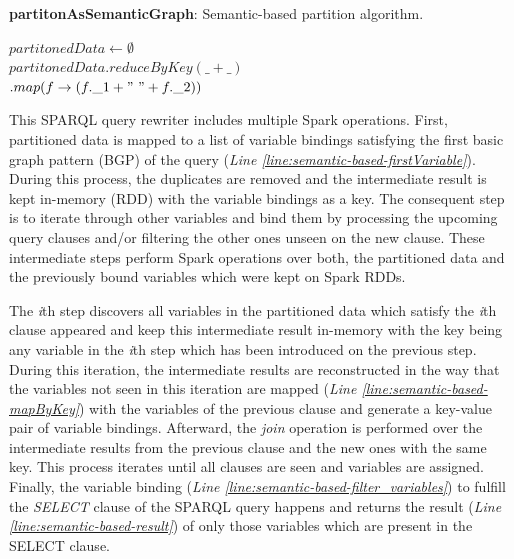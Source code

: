 \begin{algorithm*}
\caption{\textbf{partitonAsSemanticGraph}: Semantic-based partition algorithm.}
\label{alg:semantic-based-partitionGraph}
$partitonedData \leftarrow \emptyset $\\
        $partitonedData.reduceByKey(\_+\_)$\label{line:semantic-based-groupBy}\\
        \quad \quad \quad \quad \quad \quad $.map(f\rightarrow(f.\_1 + "~" + f.\_2))$ \label{line:semantic-based-partitionGraph_map}\\
\end{algorithm*}


This SPARQL query rewriter includes multiple Spark operations.
First, partitioned data is mapped to a list of variable bindings satisfying the first basic graph pattern (BGP) of the query (\textit{Line \ref{line:semantic-based-firstVariable}}). 
During this process, the duplicates are removed and the intermediate result is kept in-memory (RDD) with the variable bindings as a key.
The consequent step is to iterate through other variables and bind them by processing the upcoming query clauses and/or filtering the other ones unseen on the new clause.
These intermediate steps perform Spark operations over both, the partitioned data and the previously bound variables which were kept on Spark RDDs.

The \textit{i}th step discovers all variables in the partitioned data which satisfy the \textit{i}th clause appeared and keep this intermediate result in-memory with the key being any variable in the \textit{i}th step which has been introduced on the previous step.
During this iteration, the intermediate results are reconstructed in the way that the variables not seen in this iteration are mapped (\textit{Line \ref{line:semantic-based-mapByKey}}) with the variables of the previous clause and generate a key-value pair of variable bindings.
Afterward, the \emph{join} operation is performed over the intermediate results from the previous clause and the new ones with the same key.
This process iterates until all clauses are seen and variables are assigned.
Finally, the variable binding (\textit{Line \ref{line:semantic-based-filter_variables}}) to fulfill the \emph{SELECT} clause of the SPARQL query happens and returns the result (\textit{Line \ref{line:semantic-based-result}}) of only those variables which are present in the SELECT clause.


